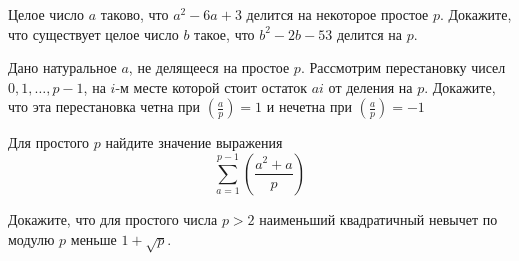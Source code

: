 \documentclass{article}
\begin{document}
\begin{enumerate_boxed}
        \item Целое число $a$ таково, что $a^2 - 6a + 3$ делится на некоторое простое $p$.
        Докажите, что существует целое число $b$ такое, что $b^2 - 2b - 53$ делится на $p$.

        \item Дано натуральное $a$, не делящееся на простое $p$.
        Рассмотрим перестановку чисел $0, 1, \ldots, p-1$, на $i$-м месте которой стоит остаток $ai$ от деления на $p$.
        Докажите, что эта перестановка четна при $\left(\frac{a}{p}\right) = 1$ и нечетна при $\left(\frac{a}{p}\right) = -1$

        \item Для простого $p$ найдите значение выражения \[\sum\limits_{a = 1}^{p-1}\left(\frac{a^2 + a}{p}\right)\]

        \item Докажите, что для простого числа $p > 2$ наименьший квадратичный невычет по модулю $p$ меньше $1 + \sqrt{p}$.

    \end{enumerate_boxed}
\end{document}
